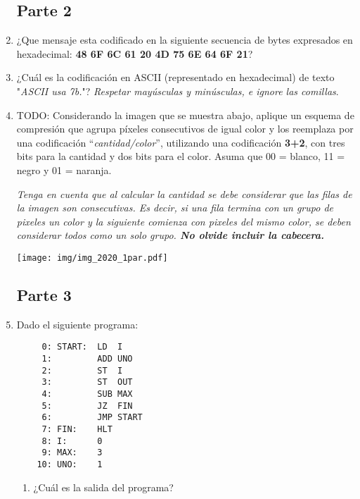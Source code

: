 \documentclass[12pt]{article}
\begin{document}
\begin{enumerate}
\subsection*{Parte 2}

    \item ¿Que mensaje esta codificado en la siguiente secuencia de bytes
        expresados en hexadecimal: \textbf{48 6F 6C 61 20 4D 75 6E 64 6F 21}?

    \item ¿Cuál es la codificación en ASCII (representado en hexadecimal) de
        texto "\emph{ASCII usa 7b.}"? \emph{Respetar mayúsculas y
        minúsculas, e ignore las comillas}.

    \item TODO: Considerando la imagen que se muestra abajo, aplique un esquema de
        compresión que agrupa píxeles consecutivos de igual color y los
        reemplaza por una codificación ``\emph{cantidad/color}'', utilizando
        una codificación \textbf{3+2}, con tres bits para la cantidad y dos
        bits para el color. Asuma que 00 = blanco, 11 = negro y 01 = naranja.

        \textit{Tenga en cuenta que al calcular la cantidad se debe considerar
        que las filas de la imagen son consecutivas. Es decir, si una fila
        termina con un grupo de pixeles un color y la siguiente comienza con
        pixeles del mismo color, se deben considerar todos como un solo grupo.
        \textbf{No olvide incluir la cabecera.}}

    \texttt{[image: img/img\_2020\_1par.pdf]}

\subsection*{Parte 3}

    \item Dado el siguiente programa:

        \begin{verbatim}
     0: START:  LD  I
     1:         ADD UNO
     2:         ST  I
     3:         ST  OUT
     4:         SUB MAX
     5:         JZ  FIN
     6:         JMP START
     7: FIN:    HLT
     8: I:      0
     9: MAX:    3
    10: UNO:    1
        \end{verbatim}

        \begin{enumerate}

            \item ¿Cuál es la salida del programa?


\end{enumerate}
\end{enumerate}
\end{document}
